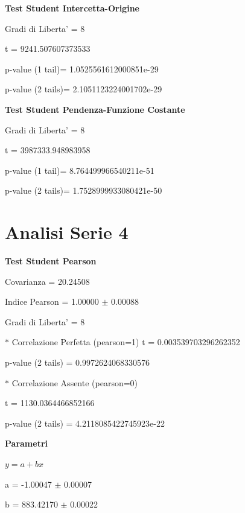 \documentclass{article}
\begin{document}
\textbf{Test Student Intercetta-Origine}

Gradi di Liberta' = 8

t = 9241.507607373533

p-value (1 tail)= 1.0525561612000851e-29

p-value (2 tails)= 2.1051123224001702e-29

\textbf{Test Student Pendenza-Funzione Costante}

Gradi di Liberta' = 8

t = 3987333.948983958

p-value (1 tail)= 8.764499966540211e-51

p-value (2 tails)= 1.7528999933080421e-50

\section*{Analisi Serie 4}

\textbf{Test Student Pearson}

Covarianza = 20.24508

Indice Pearson = 1.00000 $\pm$ 0.00088

Gradi di Liberta' = 8

$\ast$ Correlazione Perfetta (pearson=1)
t = 0.003539703296262352

p-value (2 tails) = 0.9972624068330576

$\ast$ Correlazione Assente (pearson=0)

t = 1130.0364466852166

p-value (2 tails) = 4.2118085422745923e-22

\textbf{Parametri}

$y = a + bx$

a = -1.00047 $\pm$ 0.00007

b = 883.42170 $\pm$ 0.00022
\end{document}
